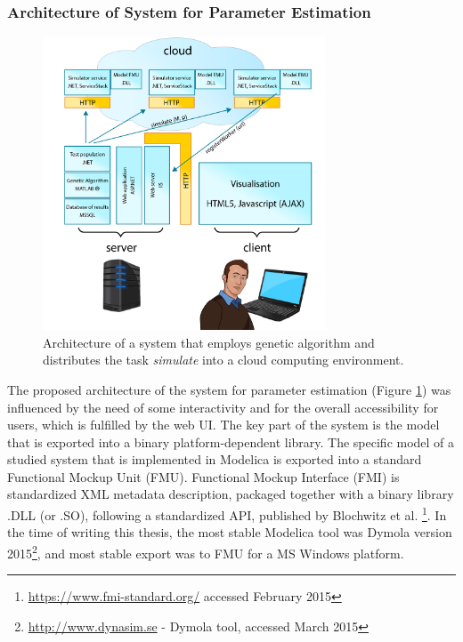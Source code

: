 \subsubsection{Architecture of System for Parameter Estimation}
\begin{figure}[hbt]
    \centering
     \includegraphics[width=0.75\textwidth]{img/chapter3-architekturaestimation-01.png}  
    \caption{Architecture of a system that employs genetic algorithm and distributes the task \emph{simulate} into a cloud computing environment.}
    \label{fig:architectureestimation}
\end{figure}
The proposed architecture of the system for parameter estimation (Figure  \ref{fig:architectureestimation}) was influenced by the need of some interactivity and for the overall accessibility for users, which is fulfilled by the web UI. The key part of the system is the model that is exported into a binary platform-dependent library. 
The specific model of a studied system that is implemented in Modelica is exported into a standard Functional Mockup Unit (FMU). Functional Mockup Interface (FMI) is standardized XML metadata description, packaged together with a binary library .DLL (or .SO), following a standardized API, published by Blochwitz et al. \cite{Blochwitza}\footnote{\url{https://www.fmi-standard.org/} accessed February 2015}. In the time of writing this thesis, the most stable Modelica tool was Dymola version 2015\footnote{\url{http://www.dynasim.se} - Dymola tool, accessed March 2015}, and most stable export was to FMU for a MS Windows platform. 

